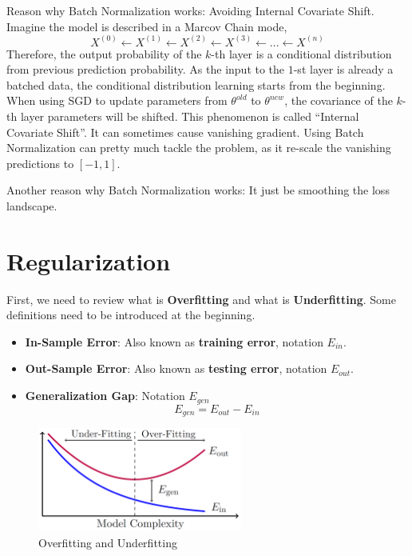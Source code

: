 \documentclass[a4paper]{article}
\begin{document}
Reason why Batch Normalization works: Avoiding Internal Covariate Shift. Imagine the model is described in a Marcov Chain mode,
\begin{equation}
	X^{(0)} \leftarrow X^{(1)} \leftarrow X^{(2)} \leftarrow X^{(3)} \leftarrow ... \leftarrow X^{(n)}
\end{equation}
Therefore, the output probability of the $k$-th layer is a conditional distribution from previous prediction probability. As the input to the $1$-st layer is already a batched data, the conditional distribution learning starts from the beginning. When using SGD to update parameters from $\theta^{old}$ to $\theta^{new}$, the covariance of the $k$-th layer parameters will be shifted. This phenomenon is called ``Internal Covariate Shift''. It can sometimes cause vanishing gradient. Using Batch Normalization can pretty much tackle the problem, as it re-scale the vanishing predictions to $[-1, 1]$.

Another reason why Batch Normalization works: It just be smoothing the loss landscape.
 
\section{Regularization}

First, we need to review what is \textbf{Overfitting} and what is \textbf{Underfitting}. Some definitions need to be introduced at the beginning.
\begin{itemize}
	\item \textbf{In-Sample Error}: Also known as \textbf{training error}, notation $E_{in}$.
	\item \textbf{Out-Sample Error}: Also known as \textbf{testing error}, notation $E_{out}$.
	\item \textbf{Generalization Gap}: Notation $E_{gen}$
	\begin{equation}
		E_{gen} = E_{out} - E_{in}
	\end{equation}
\end{itemize}

\begin{figure}[h]
	\centering
	\includegraphics[width=0.6\textwidth]{images/overfitting.png}
	\caption{Overfitting and Underfitting}
	\label{fig:mesh1}
\end{figure}
\end{document}
